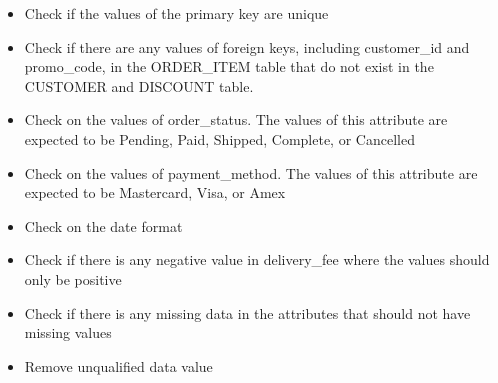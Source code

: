 \documentclass[
  letterpaper,
  DIV=11,
  numbers=noendperiod]{scrartcl}
\newenvironment{Shaded}{\begin{snugshade}}{\end{snugshade}}
\newcommand{\CommentTok}[1]{\textcolor[rgb]{0.37,0.37,0.37}{#1}}
\newcommand{\FunctionTok}[1]{\textcolor[rgb]{0.28,0.35,0.67}{#1}}
\newcommand{\NormalTok}[1]{\textcolor[rgb]{0.00,0.23,0.31}{#1}}
\newcommand{\OtherTok}[1]{\textcolor[rgb]{0.00,0.23,0.31}{#1}}
\newcommand{\SpecialCharTok}[1]{\textcolor[rgb]{0.37,0.37,0.37}{#1}}
\newcommand{\StringTok}[1]{\textcolor[rgb]{0.13,0.47,0.30}{#1}}
\begin{document}
\begin{enumerate}
  \begin{itemize}
  \item
    Check if the values of the primary key are unique
  \item
    Check if there are any values of foreign keys, including
    customer\_id and promo\_code, in the ORDER\_ITEM table that do not
    exist in the CUSTOMER and DISCOUNT table.
  \item
    Check on the values of order\_status. The values of this attribute
    are expected to be Pending, Paid, Shipped, Complete, or Cancelled
  \item
    Check on the values of payment\_method. The values of this attribute
    are expected to be Mastercard, Visa, or Amex
  \item
    Check on the date format
  \item
    Check if there is any negative value in delivery\_fee where the
    values should only be positive
  \item
    Check if there is any missing data in the attributes that should not
    have missing values
  \item
    Remove unqualified data value
  \end{itemize}

\begin{Shaded}
\end{Shaded}
\end{enumerate}
\end{document}
